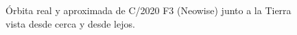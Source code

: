 \documentclass[11pt]{book}
\begin{document}
\begin{figure}[H]
\centering
{}
\caption{Órbita real y aproximada de C/2020 F3 (Neowise) junto a la Tierra vista desde cerca y desde lejos.}
\label{fig:neowise_plot}
\end{figure}
\end{document}
